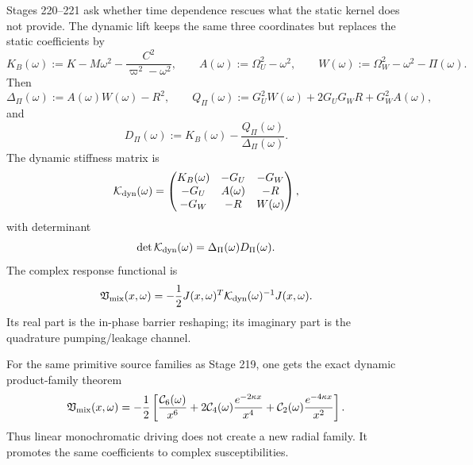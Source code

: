 Stages 220--221 ask whether time dependence rescues what the static kernel does not provide.  The dynamic lift keeps the same three coordinates but replaces the static coefficients by
\begin{equation}
\label{eq:part07-dyn-coefficients}
K_B(\omega):=K-M\omega^2-\frac{C^2}{\varpi^2-\omega^2},
\qquad
A(\omega):=\Omega_U^2-\omega^2,
\qquad
W(\omega):=\Omega_W^2-\omega^2-\Pi(\omega).
\end{equation}
Then
\begin{equation}
\label{eq:part07-dyn-delta-q-d}
\Delta_\Pi(\omega):=A(\omega)W(\omega)-R^2,
\qquad
Q_\Pi(\omega):=G_U^2W(\omega)+2G_UG_WR+G_W^2A(\omega),
\end{equation}
and
\begin{equation}
\label{eq:part07-dyn-dpi}
D_\Pi(\omega):=K_B(\omega)-\frac{Q_\Pi(\omega)}{\Delta_\Pi(\omega)}.
\end{equation}
The dynamic stiffness matrix is
\begin{equation}
\label{eq:part07-dyn-kmatrix}
\mathcal K_{\rm dyn}(\omega)=
\begin{pmatrix}
K_B(\omega) & -G_U & -G_W \\
-G_U & A(\omega) & -R \\
-G_W & -R & W(\omega)
\end{pmatrix},
\end{equation}
with determinant
\begin{equation}
\label{eq:part07-dyn-det}
\det\mathcal K_{\rm dyn}(\omega)=\Delta_\Pi(\omega)D_\Pi(\omega).
\end{equation}
The complex response functional is
\begin{equation}
\label{eq:part07-dyn-vmix}
\mathfrak V_{\rm mix}(x,\omega)
=-\frac12J(x,\omega)^T\mathcal K_{\rm dyn}(\omega)^{-1}J(x,\omega).
\end{equation}
Its real part is the in-phase barrier reshaping; its imaginary part is the quadrature pumping/leakage channel.

For the same primitive source families as Stage 219, one gets the exact dynamic product-family theorem
\begin{equation}
\label{eq:part07-dyn-product-family}
\mathfrak V_{\rm mix}(x,\omega)
=-\frac12\left[
\frac{\mathcal C_6(\omega)}{x^6}
+2\mathcal C_4(\omega)\frac{e^{-2\kappa x}}{x^4}
+\mathcal C_2(\omega)\frac{e^{-4\kappa x}}{x^2}
\right].
\end{equation}
Thus linear monochromatic driving does not create a new radial family.  It promotes the same coefficients to complex susceptibilities.

